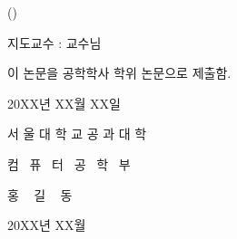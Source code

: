 \begin{center}

    \vspace*{50pt}

    {\fontsize{24}{0}\selectfont \korpapertitle}

    \vspace*{12pt}

    {\fontsize{18}{0}\selectfont (\engpapertitle)}

    \vspace*{80pt}

    {\fontsize{18}{0}\selectfont 지도교수 : 교수님}

    \vspace*{80pt}

    {\fontsize{20}{0}\selectfont 이 논문을 공학학사 학위 논문으로 제출함.}

    \vspace*{85pt}

    {\fontsize{18}{0}\selectfont 20XX년 \hspace*{8pt} XX월 \hspace*{8pt} XX일}

    \vspace*{70pt}

    {\fontsize{20}{0}\selectfont 서 울 대 학 교 \hspace*{5pt} 공 과 대 학}

    \vspace*{10pt}

    {\fontsize{20}{0}\selectfont 컴 ~퓨 ~터 ~공 ~학 ~부}

    \vspace*{10pt}

    {\fontsize{20}{0}\selectfont 홍 ~ 길 ~ 동}

    \vspace*{40pt}

    {\fontsize{20}{0}\selectfont 20XX년 \hspace*{5pt} XX월}
\end{center}

\thispagestyle{empty}
\pagebreak
